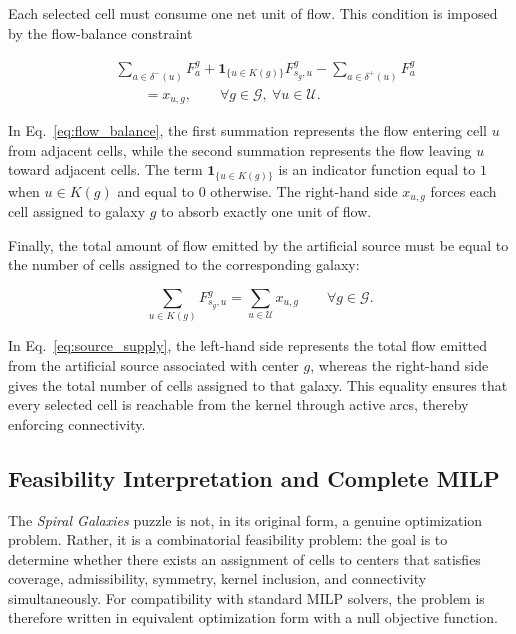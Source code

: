 Each selected cell must consume one net unit of flow. This condition is imposed by the flow-balance constraint

\begin{equation}
\begin{aligned}
& \sum_{a\in\delta^-(u)} F^g_a
  + \mathbf{1}_{\{u\in K(g)\}} F^g_{s_g,u}
  - \sum_{a\in\delta^+(u)} F^g_a \\
& \qquad = x_{u,g},
\qquad \forall g \in \mathcal{G},\ \forall u \in \mathcal{U}.
\end{aligned}
\label{eq:flow_balance}
\end{equation}

In Eq.~\ref{eq:flow_balance}, the first summation represents the flow entering cell \(u\) from adjacent cells, while the second summation represents the flow leaving \(u\) toward adjacent cells. The term \(\mathbf{1}_{\{u\in K(g)\}}\) is an indicator function equal to \(1\) when \(u\in K(g)\) and equal to \(0\) otherwise. The right-hand side \(x_{u,g}\) forces each cell assigned to galaxy \(g\) to absorb exactly one unit of flow.

Finally, the total amount of flow emitted by the artificial source must be equal to the number of cells assigned to the corresponding galaxy:

\begin{equation}
\sum_{u\in K(g)} F^g_{s_g,u}
=
\sum_{u\in\mathcal{U}} x_{u,g}
\qquad
\forall g \in \mathcal{G}.
\label{eq:source_supply}
\end{equation}

In Eq.~\ref{eq:source_supply}, the left-hand side represents the total flow emitted from the artificial source associated with center \(g\), whereas the right-hand side gives the total number of cells assigned to that galaxy. This equality ensures that every selected cell is reachable from the kernel through active arcs, thereby enforcing connectivity.

\subsection{Feasibility Interpretation and Complete MILP}

The \textit{Spiral Galaxies} puzzle is not, in its original form, a genuine
optimization problem. Rather, it is a combinatorial feasibility problem: the
goal is to determine whether there exists an assignment of cells to centers
that satisfies coverage, admissibility, symmetry, kernel inclusion, and
connectivity simultaneously. For compatibility with standard MILP solvers, the
problem is therefore written in equivalent optimization form with a null
objective function.

